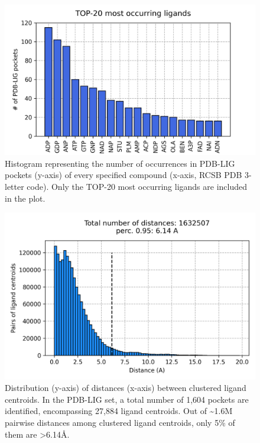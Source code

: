 \begin{figure}[htbp]
  \centering
  \includegraphics[width=0.7\linewidth]{figures/PocketVec/Supplementary/FigS30.png}
  \caption{
  Histogram representing the number of occurrences in PDB-LIG pockets (y-axis) of every specified compound (x-axis, RCSB PDB 3-letter code). Only the TOP-20 most occurring ligands are included in the plot. 
  }
  \label{PocketVec_FigS30}
\end{figure}


\begin{figure}[htbp]
  \centering
  \includegraphics[width=0.7\linewidth]{figures/PocketVec/Supplementary/FigS31.png}
  \caption{
  Distribution (y-axis) of distances (x-axis) between clustered ligand centroids. In the PDB-LIG set, a total number of 1,604 pockets are identified, encompassing 27,884 ligand centroids. Out of \textasciitilde1.6M pairwise distances among clustered ligand centroids, only 5\% of them are >6.14Å.
  }
  \label{PocketVec_FigS31}
\end{figure}






  





